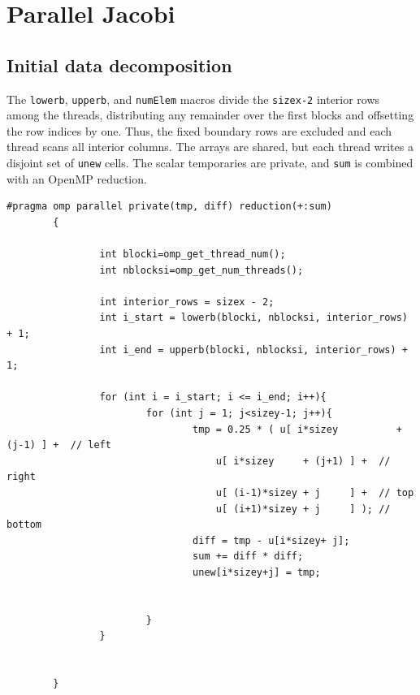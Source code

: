 \documentclass[11pt,a4paper]{article}
\begin{document}
\FloatBarrier

\section{Parallel Jacobi}

\subsection{Initial data decomposition}

The \texttt{lowerb}, \texttt{upperb}, and \texttt{numElem} macros divide
the \texttt{sizex-2} interior rows among the threads, distributing any
remainder over the first blocks and offsetting the row indices by one.
Thus, the fixed boundary rows are excluded and each thread scans all
interior columns. The arrays are shared, but each thread writes a
disjoint set of \texttt{unew} cells. The scalar temporaries are private,
and \texttt{sum} is combined with an OpenMP reduction.

\begin{lstlisting}[caption={Initial parallel Jacobi implementation.}]
 #pragma omp parallel private(tmp, diff) reduction(+:sum) 
        {

                int blocki=omp_get_thread_num();
                int nblocksi=omp_get_num_threads();
        
                int interior_rows = sizex - 2;
                int i_start = lowerb(blocki, nblocksi, interior_rows) + 1;
                int i_end = upperb(blocki, nblocksi, interior_rows) + 1;

                for (int i = i_start; i <= i_end; i++){
                        for (int j = 1; j<sizey-1; j++){
                                tmp = 0.25 * ( u[ i*sizey          + (j-1) ] +  // left
                                    u[ i*sizey     + (j+1) ] +  // right
                                    u[ (i-1)*sizey + j     ] +  // top
                                    u[ (i+1)*sizey + j     ] ); // bottom
                                diff = tmp - u[i*sizey+ j];
                                sum += diff * diff;
                                unew[i*sizey+j] = tmp;
          
        
                        }
                }       
                
                
        }       
\end{lstlisting}
\end{document}
